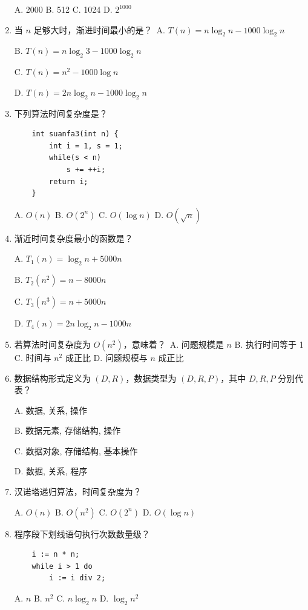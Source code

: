 \documentclass[lang=cn,newtx,10pt,scheme=chinese]{../../elegantbook}
\begin{document}
\begin{enumerate}
    A. 2000 \quad B. 512 \quad C. 1024 \quad D. $2^{1000}$

    \item 当 $n$ 足够大时，渐进时间最小的是？\
    A. $T(n)=n\log_2 n -1000\log_2 n$ \quad 
    
    B. $T(n)=n\log_2 3 -1000\log_2 n$ \

    C. $T(n)=n^2 -1000\log n$ \quad
    
    D. $T(n)=2n\log_2 n -1000\log_2 n$

    \item 下列算法时间复杂度是？
    \begin{verbatim}
    int suanfa3(int n) {
        int i = 1, s = 1;
        while(s < n)
            s += ++i;
        return i;
    }
    \end{verbatim}
    A. $O(n)$ \quad B. $O(2^n)$ \quad C. $O(\log n)$ \quad D. $O(\sqrt{n})$

    \item 渐近时间复杂度最小的函数是？\
    
    A. $T_1(n) = \log_2 n + 5000n$ \quad
    
    B. $T_2(n^2) = n - 8000n$ \

    C. $T_3(n^3) = n + 5000n$ \quad 
    
    D. $T_4(n) = 2n\log_2 n -1000n$

    \item 若算法时间复杂度为 $O(n^2)$，意味着？\
    A. 问题规模是 $n$ \quad B. 执行时间等于 1 \quad C. 时间与 $n^2$ 成正比 \quad D. 问题规模与 $n$ 成正比

    \item 数据结构形式定义为 $(D, R)$，数据类型为 $(D, R, P)$，其中 $D, R, P$ 分别代表？\
    
    A. 数据, 关系, 操作 \quad 
    
    B. 数据元素, 存储结构, 操作 \

    C. 数据对象, 存储结构, 基本操作 \quad 
    
    D. 数据, 关系, 程序

    \item 汉诺塔递归算法，时间复杂度为？\
    
    A. $O(n)$ \quad B. $O(n^2)$ \quad C. $O(2^n)$ \quad D. $O(\log n)$

    \item 程序段下划线语句执行次数数量级？
    \begin{verbatim}
    i := n * n;
    while i > 1 do
        i := i div 2;
    \end{verbatim}
    A. $n$ \quad B. ${n^2}$ \quad C. $n\log_2 n$ \quad D. $\log_2 n^2$


\end{enumerate}
\end{document}
